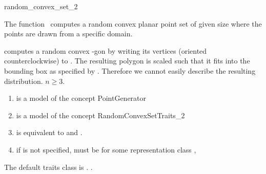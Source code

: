 

\begin{ccRefFunction}{random_convex_set_2}

\ccDefinition

The function \ccRefName\ computes a random convex planar
point set of given size where the points are drawn from a specific
domain.


\def\ccLongParamLayout{\ccTrue} 

{
computes a random convex -gon by writing its vertices (oriented
counterclockwise) to . The resulting polygon is scaled such
that it fits into the bounding box as specified by . Therefore
we cannot easily describe the resulting distribution.
\ccPrecond $n \ge 3$.
}

\begin{enumerate}
\item {} is a model of the concept PointGenerator
\item {} is a model of the concept RandomConvexSetTraits\_2 
\item {} is equivalent to 
       and .
\item if  is not specified,
   must be  for some representation class ,
\end{enumerate}


The default traits class  is 
.
.

\ccSeeAlso 
{} \\
 \\


\end{ccRefFunction}
